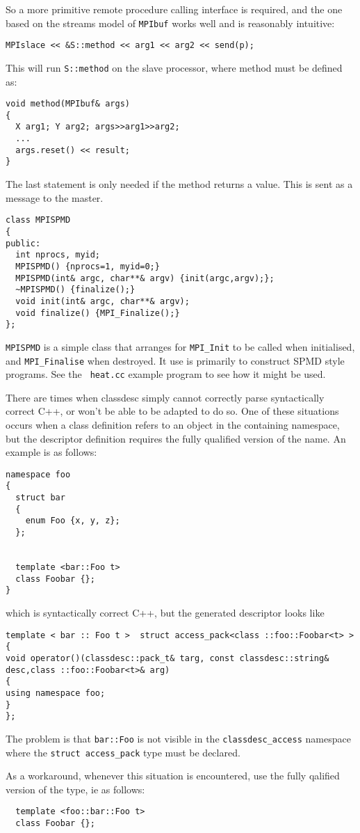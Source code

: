 So a more primitive remote procedure calling interface is required,
and the one based on the streams model of {\tt MPIbuf} works well and
is reasonably intuitive:
\begin{verbatim}
MPIslace << &S::method << arg1 << arg2 << send(p);
\end{verbatim}
This will run {\tt S::method} on the slave processor, where method
must be defined as:
\begin{verbatim}
void method(MPIbuf& args)
{
  X arg1; Y arg2; args>>arg1>>arg2;
  ...
  args.reset() << result;
}
\end{verbatim}

The last statement is only needed if the method returns a value. This
is sent as a message to the master.


\begin{verbatim}
class MPISPMD
{
public:
  int nprocs, myid;
  MPISPMD() {nprocs=1, myid=0;}
  MPISPMD(int& argc, char**& argv) {init(argc,argv);};
  ~MPISPMD() {finalize();}
  void init(int& argc, char**& argv);
  void finalize() {MPI_Finalize();}
};
\end{verbatim}

{\tt MPISPMD} is a simple class that arranges for \verb+MPI_Init+ to
be called when initialised, and \verb+MPI_Finalise+ when destroyed. It
use is primarily to construct SPMD style programs. See the {\tt
heat.cc} example program to see how it might be used.


There are times when classdesc simply cannot correctly parse
syntactically correct C++, or won't be able to be adapted to do
so. One of these situations occurs when a class definition refers to
an object in the containing namespace, but the descriptor definition
requires the fully qualified version of the name. An example is as
follows:

\begin{verbatim}
namespace foo
{
  struct bar
  {
    enum Foo {x, y, z};
  };


  template <bar::Foo t>
  class Foobar {};
}
\end{verbatim}
which is syntactically correct C++, but the generated descriptor looks
like
\begin{verbatim}
template < bar :: Foo t >  struct access_pack<class ::foo::Foobar<t> > {
void operator()(classdesc::pack_t& targ, const classdesc::string& desc,class ::foo::Foobar<t>& arg)
{
using namespace foo;
}
};
\end{verbatim}
The problem is that \verb+bar::Foo+ is not visible in the
\verb+classdesc_access+ namespace where the \verb+struct access_pack+
type must be declared.

As a workaround, whenever this situation is encountered, use the fully
qalified version of the type, ie as follows:
\begin{verbatim}
  template <foo::bar::Foo t>
  class Foobar {};
\end{verbatim}
